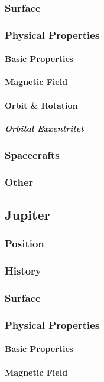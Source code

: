\subsubsection{Surface}
\subsubsection{Physical Properties}
\paragraph{Basic Properties}
\paragraph{Magnetic Field}
\paragraph{Orbit \& Rotation}
\subparagraph{Orbital Exxentritet}
\subsubsection{Spacecrafts}
\subsubsection{Other}
\subsection{Jupiter}
\subsubsection{Position}
\subsubsection{History}
\subsubsection{Surface}
\subsubsection{Physical Properties}
\paragraph{Basic Properties}
\paragraph{Magnetic Field}
